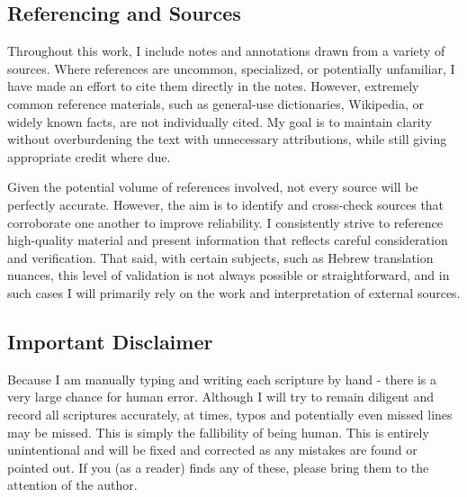 \medskip


\medskip





\subsection*{Referencing and Sources}

Throughout this work, I include notes and annotations drawn from a variety of sources. Where references are uncommon, specialized, or potentially unfamiliar, I have made an effort to cite them directly in the notes. However, extremely common reference materials, such as general-use dictionaries, Wikipedia, or widely known facts, are not individually cited. My goal is to maintain clarity without overburdening the text with unnecessary attributions, while still giving appropriate credit where due.

\tab Given the potential volume of references involved, not every source will be perfectly accurate. However, the aim is to identify and cross-check sources that corroborate one another to improve reliability. I consistently strive to reference high-quality material and present information that reflects careful consideration and verification. That said, with certain subjects, such as Hebrew translation nuances, this level of validation is not always possible or straightforward, and in such cases I will primarily rely on the work and interpretation of external sources.




\subsection*{Important Disclaimer}

Because I am manually typing and writing each scripture by hand - there is a very large chance for human error. Although I will try to remain diligent and record all scriptures accurately, at times, typos and potentially even missed lines may be missed. This is simply the fallibility of being human. This is entirely unintentional and will be fixed and corrected as any mistakes are found or pointed out. If you (as a reader) finds any of these, please bring them to the attention of the author.
